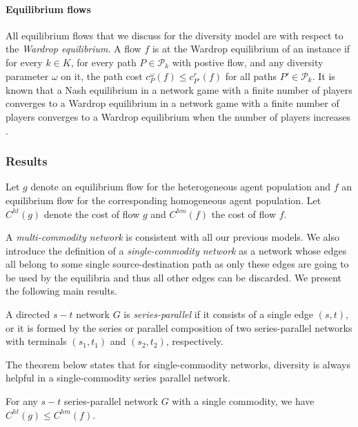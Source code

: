 \paragraph{Equilibrium flows} All equilibrium flows that we discuss for the diversity model are with respect to the {\it Wardrop equilibrium}. A flow $f$ is at the Wardrop equilibrium of an instance if for every $k\in K$, for every path $P\in \mathcal{P}_k$ with postive flow, and any diversity parameter $\omega$ on it, the path cost $c_P^\omega(f)\le c_{P'}^r(f)$ for all paths $P'\in \mathcal{P}_k$. It is known that a Nash equilibrium in a network game with a finite number of players converges to a Wardrop equilibrium in a network game with a finite number of players converges to a Wardrop equilibrium when the number of players increases \cite{haurie}.

\subsubsection{Results}
Let $g$ denote an equilibrium flow for the heterogeneous agent population and $f$ an equilibrium flow for the corresponding homogeneous agent population. Let $C^{ht}(g)$ denote the cost of flow $g$ and $C^{hm}(f)$ the cost of flow $f$. 

A {\it multi-commodity network} is consistent with all our previous models. We also introduce the definition of a {\it single-commodity network} as a network whose edges all belong to some single source-destination path as only these edges are going to be used by the equilibria and thus all other edges can be discarded. We present the following main results.

\begin{definition}
A directed $s-t$ network $G$ is {\it series-parallel} if it consists of a single edge $(s, t)$, or it is formed by the series or parallel composition of two series-parallel networks with terminals $(s_1, t_1)$ and $(s_2, t_2)$, respectively.
\end{definition}

The theorem below states that for single-commodity networks, diversity is always helpful in a single-commodity series parallel network.

\begin{theorem}
For any $s-t$ series-parallel network $G$ with a single commodity, we have $C^{ht}(g)\le C^{hm}(f)$.
\label{diverse1}
\end{theorem}


